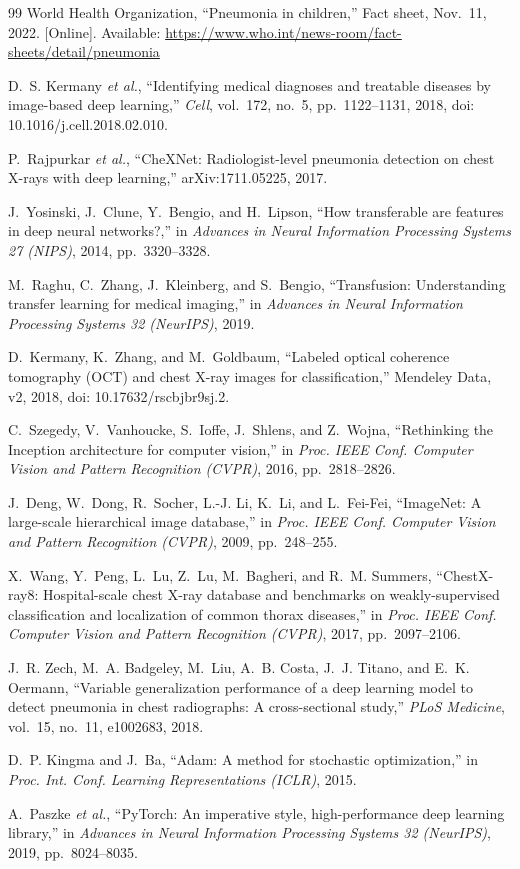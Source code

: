 \documentclass[conference]{IEEEtran}
\begin{document}
\begin{thebibliography}{99}
 World Health Organization, ``Pneumonia in children,'' Fact sheet, Nov.~11, 2022. [Online]. Available: \url{https://www.who.int/news-room/fact-sheets/detail/pneumonia}

 D.~S. Kermany \emph{et al.}, ``Identifying medical diagnoses and treatable diseases by image-based deep learning,'' \emph{Cell}, vol.~172, no.~5, pp.~1122--1131, 2018, doi: 10.1016/j.cell.2018.02.010.

 P.~Rajpurkar \emph{et al.}, ``CheXNet: Radiologist-level pneumonia detection on chest X-rays with deep learning,'' arXiv:1711.05225, 2017.

 J.~Yosinski, J.~Clune, Y.~Bengio, and H.~Lipson, ``How transferable are features in deep neural networks?,'' in \emph{Advances in Neural Information Processing Systems 27 (NIPS)}, 2014, pp.~3320--3328.

 M.~Raghu, C.~Zhang, J.~Kleinberg, and S.~Bengio, ``Transfusion: Understanding transfer learning for medical imaging,'' in \emph{Advances in Neural Information Processing Systems 32 (NeurIPS)}, 2019.

 D.~Kermany, K.~Zhang, and M.~Goldbaum, ``Labeled optical coherence tomography (OCT) and chest X-ray images for classification,'' Mendeley Data, v2, 2018, doi: 10.17632/rscbjbr9sj.2.

 C.~Szegedy, V.~Vanhoucke, S.~Ioffe, J.~Shlens, and Z.~Wojna, ``Rethinking the Inception architecture for computer vision,'' in \emph{Proc. IEEE Conf. Computer Vision and Pattern Recognition (CVPR)}, 2016, pp.~2818--2826.

 J.~Deng, W.~Dong, R.~Socher, L.-J. Li, K.~Li, and L.~Fei-Fei, ``ImageNet: A large-scale hierarchical image database,'' in \emph{Proc. IEEE Conf. Computer Vision and Pattern Recognition (CVPR)}, 2009, pp.~248--255.

 X.~Wang, Y.~Peng, L.~Lu, Z.~Lu, M.~Bagheri, and R.~M. Summers, ``ChestX-ray8: Hospital-scale chest X-ray database and benchmarks on weakly-supervised classification and localization of common thorax diseases,'' in \emph{Proc. IEEE Conf. Computer Vision and Pattern Recognition (CVPR)}, 2017, pp.~2097--2106.

 J.~R. Zech, M.~A. Badgeley, M.~Liu, A.~B. Costa, J.~J. Titano, and E.~K. Oermann, ``Variable generalization performance of a deep learning model to detect pneumonia in chest radiographs: A cross-sectional study,'' \emph{PLoS Medicine}, vol.~15, no.~11, e1002683, 2018.

 D.~P. Kingma and J.~Ba, ``Adam: A method for stochastic optimization,'' in \emph{Proc. Int. Conf. Learning Representations (ICLR)}, 2015.

 A.~Paszke \emph{et al.}, ``PyTorch: An imperative style, high-performance deep learning library,'' in \emph{Advances in Neural Information Processing Systems 32 (NeurIPS)}, 2019, pp.~8024--8035.
\end{thebibliography}
\end{document}
